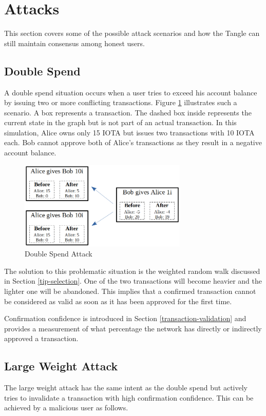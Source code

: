 \section{Attacks}\label{attacks}
This section covers some of the possible attack scenarios and how the Tangle can still maintain consensus among honest users.

\subsection{Double Spend}
A double spend situation occurs when a user tries to exceed his account balance by issuing two or more conflicting transactions. Figure \ref{fig:double-spend} illustrates such a scenario. A box represents a transaction. The dashed box inside represents the current state in the graph but is not part of an actual transaction. In this simulation, Alice owns only 15 IOTA but issues two transactions with 10 IOTA each. Bob cannot approve both of Alice's transactions as they result in a negative account balance.

\begin{figure}[H]
    \centering
    \includegraphics[width=8cm]{images/double-spend.png}
    \caption{Double Spend Attack \cite{the-tangle-part-5}}
    \label{fig:double-spend}
\end{figure}

The solution to this problematic situation is the weighted random walk discussed in Section \ref{tip-selection}. One of the two transactions will become heavier and the lighter one will be abandoned. This implies that a confirmed transaction cannot be considered as valid as soon as it has been approved for the first time. 

Confirmation confidence is introduced in Section \ref{transaction-validation} and provides a measurement of what percentage the network has directly or indirectly approved a transaction. 


\subsection{Large Weight Attack}
The large weight attack has the same intent as the double spend but actively tries to invalidate a transaction with high confirmation confidence. This can be achieved by a malicious user as follows.

